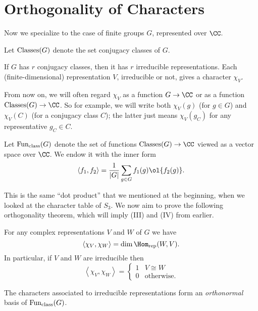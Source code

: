 \section{Orthogonality of Characters}
Now we specialize to the case of finite groups $G$, represented over $\CC$.
\begin{definition}
	Let $\operatorname{Classes}(G)$ denote the set conjugacy classes of $G$.
\end{definition}
If $G$ has $r$ conjugacy classes, then it has $r$ irreducible representations.
Each (finite-dimensional) representation $V$, irreducible or not, gives a
character $\chi_V$.
\begin{abuse}
	From now on, we will often regard $\chi_V$ as a function $G \to \CC$
	or as a function $\Classes(G) \to \CC$.
	So for example, we will write both $\chi_V(g)$ (for $g \in G$)
	and $\chi_V(C)$ (for a conjugacy class $C$);
	the latter just means $\chi_V(g_C)$ for any representative $g_C \in C$.
\end{abuse}
\begin{definition}
	Let $\operatorname{Fun}_{\mathrm{class}}(G)$ denote the set of functions $\Classes(G) \to \CC$
	viewed as a vector space over $\CC$.
	We endow it with the inner form
	\[
		\left< f_1, f_2 \right> = 
		\frac{1}{|G|}
		\sum_{g \in G} f_1(g) \ol{f_2(g)}.
	\]
\end{definition}
This is the same ``dot product'' that we mentioned at the beginning,
when we looked at the character table of $S_3$.
We now aim to prove the following orthogonality theorem,
which will imply (III) and (IV) from earlier.
\begin{theorem}[Orthogonality]
	For any complex representations $V$ and $W$ of $G$ we have
	\[ \left< \chi_V, \chi_W \right> = \dim \Homrep(W, V). \]
	In particular, if $V$ and $W$ are irreducible then
	\[ \left< \chi_V, \chi_W \right> 
		=
		\begin{cases}
			1 & V  \cong W \\
			0 & \text{otherwise}.
		\end{cases}
	\]
\end{theorem}
\begin{corollary}
	The characters associated to irreducible representations
	form an \emph{orthonormal} basis of $\operatorname{Fun}_{\mathrm{class}}(G)$.
\end{corollary}

